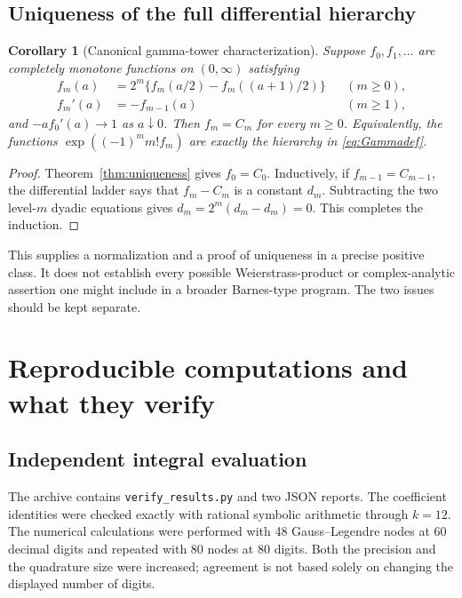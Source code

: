 \documentclass[11pt,letterpaper]{article}
\numberwithin{equation}{section}
\newtheorem{corollary}[theorem]{Corollary}
\theoremstyle{definition}
\theoremstyle{remark}
\begin{document}
\subsection{Uniqueness of the full differential hierarchy}
\begin{corollary}[Canonical gamma-tower characterization]\label{cor:towerunique}
Suppose $f_0,f_1,\ldots$ are completely monotone functions on
$(0,\infty)$ satisfying
\begin{equation}\label{eq:toweraxioms}
 \begin{aligned}
 f_m(a)&=2^m\{f_m(a/2)-f_m((a+1)/2)\} &&(m\ge0),\\
 f_m'(a)&=-f_{m-1}(a) &&(m\ge1),
 \end{aligned}
\end{equation}
and $-af_0'(a)\to1$ as $a\downarrow0$.
Then $f_m=C_m$ for every $m\ge0$. Equivalently, the functions
$\exp((-1)^m m!f_m)$ are exactly the hierarchy in
\eqref{eq:Gammadef}.
\end{corollary}
\begin{proof}
Theorem~\ref{thm:uniqueness} gives $f_0=C_0$.
Inductively, if $f_{m-1}=C_{m-1}$, the differential ladder says that
$f_m-C_m$ is a constant $d_m$.
Subtracting the two level-$m$ dyadic equations gives
$d_m=2^m(d_m-d_m)=0$. This completes the induction.
\end{proof}

This supplies a normalization and a proof of uniqueness in a precise
positive class. It does not establish every possible Weierstrass-product
or complex-analytic assertion one might include in a broader Barnes-type
program. The two issues should be kept separate.

\section{Reproducible computations and what they verify}\label{sec:numerics}

\subsection{Independent integral evaluation}
The archive contains \texttt{verify\_results.py} and two JSON reports.
The coefficient identities were checked exactly with rational symbolic
arithmetic through $k=12$. The numerical calculations were performed
with 48 Gauss--Legendre nodes at 60 decimal digits and repeated with
80 nodes at 80 digits. Both the precision and the quadrature size were
increased; agreement is not based solely on changing the displayed number
of digits.
\end{document}
